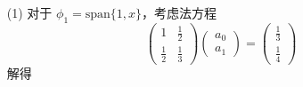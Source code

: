 \documentclass{sjtuarticle}
\begin{document}
\begin{itemize}
\begin{solution}
        \begin{itemize}
            \item[(1)] 对于 $\phi_1=\text{span}\{1,x\}$，考虑法方程
            \begin{equation*}
                \begin{pmatrix}
                    1 & \frac{1}{2} \\ \frac{1}{2} & \frac{1}{3}
                \end{pmatrix}\begin{pmatrix}
                    a_0 \\ a_1
                \end{pmatrix}=\begin{pmatrix}
                    \frac{1}{3} \\ \frac{1}{4}
                \end{pmatrix}
            \end{equation*}
            解得
            \begin{equation*}

\end{equation*}
\end{itemize}
\end{solution}
\end{itemize}
\end{document}
